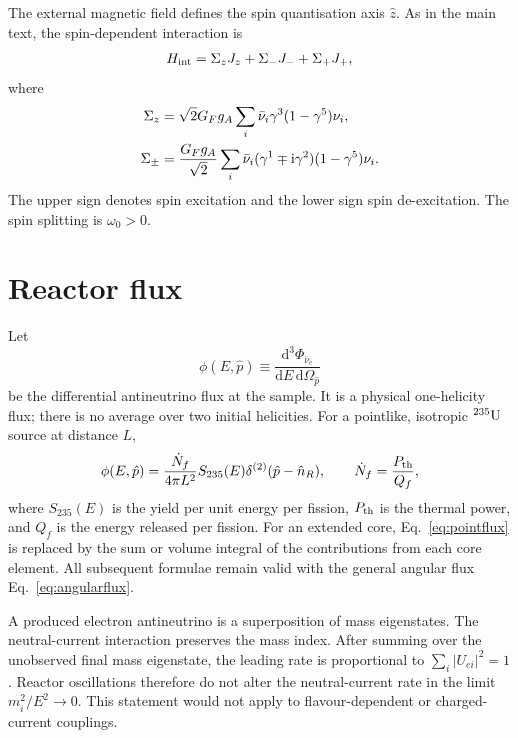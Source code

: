 \documentclass[aps,prd,10pt,onecolumn,nofootinbib,amsmath,amssymb]{revtex4-1}
\newcommand{\dd}{\mathrm{d}}
\begin{document}
The external magnetic field defines the spin quantisation axis
\(\hat z\).  As in the main text, the spin-dependent interaction is
\begin{equation}
 H_{\rm int}
 =\Sigma_z J_z+\Sigma_-J_-+\Sigma_+J_+ ,
\end{equation}
where
\begin{equation}
\begin{aligned}
 \Sigma_z
 &=\sqrt{2}G_F g_A\sum_i
   \bar\nu_i\gamma^3(1-\gamma^5)\nu_i,\\
 \Sigma_\pm
 &=\frac{G_Fg_A}{\sqrt{2}}\sum_i
   \bar\nu_i(\gamma^1\mp{\rm i}\gamma^2)
   (1-\gamma^5)\nu_i .
\end{aligned}
\label{eq:Sigma}
\end{equation}
The upper sign denotes spin excitation and the lower sign spin
de-excitation.  The spin splitting is \(\omega_0>0\).

\section{Reactor flux}
\label{sec:flux}

Let
\begin{equation}
 \phi(E,\hat p)
 \equiv\frac{\dd^3\Phi_{\bar\nu_e}}
 {\dd E\,\dd\Omega_{\hat p}}
\label{eq:angularflux}
\end{equation}
be the differential antineutrino flux at the sample.  It is a physical
one-helicity flux; there is no average over two initial helicities.  For a
pointlike, isotropic \(^{235}{\rm U}\) source at distance \(L\),
\begin{equation}
 \phi(E,\hat p)
 =\frac{\dot N_f}{4\pi L^2}S_{235}(E)
   \delta^{(2)}(\hat p-\hat n_R),
\qquad
 \dot N_f=\frac{P_{\rm th}}{Q_f},
\label{eq:pointflux}
\end{equation}
where \(S_{235}(E)\) is the yield per unit energy per fission, \(P_{\rm th}\)
is the thermal power, and \(Q_f\) is the energy released per fission.  For
an extended core, Eq.~\eqref{eq:pointflux} is replaced by the sum or volume
integral of the contributions from each core element.  All subsequent
formulae remain valid with the general angular flux
Eq.~\eqref{eq:angularflux}.

A produced electron antineutrino is a superposition of mass eigenstates.
The neutral-current interaction preserves the mass index.  After summing
over the unobserved final mass eigenstate, the leading rate is proportional
to
\(\sum_i|U_{ei}|^2=1\).  Reactor oscillations therefore do not alter the
neutral-current rate in the limit \(m_i^2/E^2\to0\).  This statement would
not apply to flavour-dependent or charged-current couplings.
\end{document}
